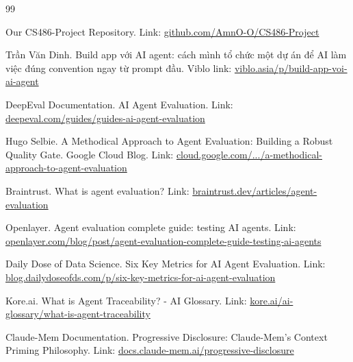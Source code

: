 \begin{thebibliography}{99}

Our CS486-Project Repository. Link: \href{https://github.com/AmnO-O/CS486-Project}{github.com/AmnO-O/CS486-Project}

Trần Văn Dinh. Build app với AI agent: cách mình tổ chức một dự án để AI làm việc đúng convention ngay từ prompt đầu.
Viblo link: \href{https://viblo.asia/p/build-app-voi-ai-agent-cach-minh-to-chuc-mot-du-an-de-ai-lam-viec-dung-convention-ngay-tu-prompt-dau-wd43EZ23LX9}{viblo.asia/p/build-app-voi-ai-agent}

DeepEval Documentation. AI Agent Evaluation.
Link: \href{https://deepeval.com/guides/guides-ai-agent-evaluation}{deepeval.com/guides/guides-ai-agent-evaluation}

Hugo Selbie. A Methodical Approach to Agent Evaluation: Building a Robust Quality Gate.
Google Cloud Blog. Link: \href{https://cloud.google.com/blog/topics/developers-practitioners/a-methodical-approach-to-agent-evaluation}{cloud.google.com/.../a-methodical-approach-to-agent-evaluation}

Braintrust. What is agent evaluation?
Link: \href{https://www.braintrust.dev/articles/agent-evaluation}{braintrust.dev/articles/agent-evaluation}

Openlayer. Agent evaluation complete guide: testing AI agents.
Link: \href{https://www.openlayer.com/blog/post/agent-evaluation-complete-guide-testing-ai-agents}{openlayer.com/blog/post/agent-evaluation-complete-guide-testing-ai-agents}

Daily Dose of Data Science. Six Key Metrics for AI Agent Evaluation.
Link: \href{https://blog.dailydoseofds.com/p/six-key-metrics-for-ai-agent-evaluation}{blog.dailydoseofds.com/p/six-key-metrics-for-ai-agent-evaluation}

Kore.ai. What is Agent Traceability? - AI Glossary.
Link: \href{https://www.kore.ai/ai-glossary/what-is-agent-traceability}{kore.ai/ai-glossary/what-is-agent-traceability}

Claude-Mem Documentation. Progressive Disclosure: Claude-Mem's Context Priming Philosophy.
Link: \href{https://docs.claude-mem.ai/progressive-disclosure}{docs.claude-mem.ai/progressive-disclosure}


\end{thebibliography}
